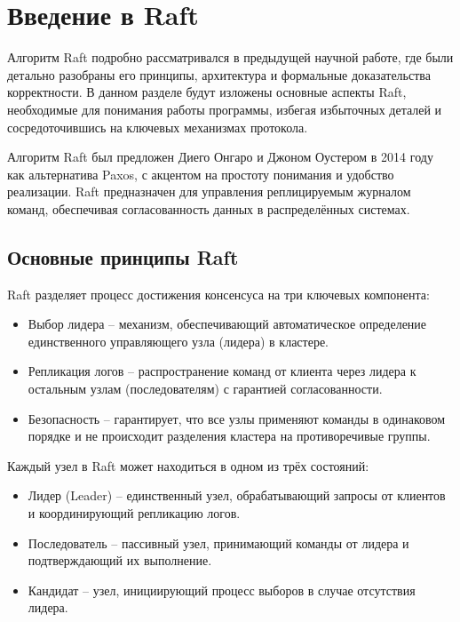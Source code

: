\section{Введение в Raft}

Алгоритм Raft подробно рассматривался в предыдущей научной работе, где были детально
разобраны его принципы, архитектура и формальные доказательства корректности. В данном
разделе будут изложены основные аспекты Raft, необходимые для понимания работы программы,
избегая избыточных деталей и сосредоточившись на ключевых механизмах протокола.

Алгоритм Raft был предложен Диего Онгаро и Джоном Оустером в 2014 году как альтернатива
Paxos, с акцентом на простоту понимания и удобство реализации. Raft предназначен для
управления реплицируемым журналом команд, обеспечивая согласованность данных в
распределённых системах.

\subsection{Основные принципы Raft}

Raft разделяет процесс достижения консенсуса на три ключевых компонента:

\begin{itemize}
    \item Выбор лидера – механизм, обеспечивающий автоматическое определение
    единственного управляющего узла (лидера) в кластере.
    \item Репликация логов – распространение команд от клиента через лидера к остальным
    узлам (последователям) с гарантией согласованности.
    \item Безопасность – гарантирует, что все узлы применяют команды в одинаковом
    порядке и не происходит разделения кластера на противоречивые группы.
\end{itemize}

Каждый узел в Raft может находиться в одном из трёх состояний:

\begin{itemize}
    \item Лидер (Leader) – единственный узел, обрабатывающий запросы от клиентов и
    координирующий репликацию логов.
    \item Последователь – пассивный узел, принимающий команды от лидера и подтверждающий
    их выполнение.
    \item Кандидат – узел, инициирующий процесс выборов в случае отсутствия лидера.
\end{itemize}

